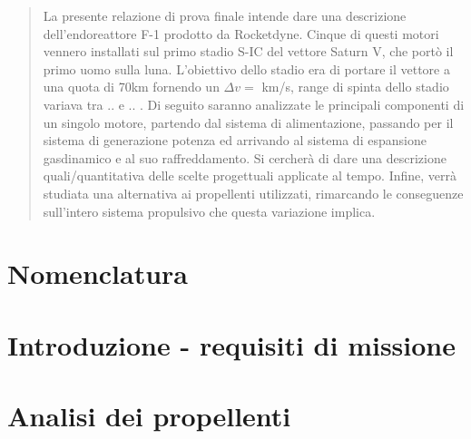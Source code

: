 \documentclass[11pt,a4paper,twocolumn]{article}
\begin{document}


\begin{strip}
    \centering
    \begin{minipage}{1\textwidth}
        \begin{abstract}
La presente relazione di prova finale intende dare una descrizione dell'endoreattore F-1 prodotto da Rocketdyne. Cinque di questi motori vennero installati sul primo stadio S-IC del vettore Saturn V, che portò il primo uomo sulla luna. L'obiettivo dello stadio era di portare il vettore a una quota di 70km fornendo un $\Delta v = $ km/s, range di spinta dello stadio variava tra .. e .. . Di seguito saranno analizzate le principali componenti di un singolo motore, partendo dal sistema di alimentazione, passando per il sistema di generazione potenza ed arrivando al sistema di espansione gasdinamico e al suo raffreddamento. Si cercherà di dare una descrizione quali/quantitativa delle scelte progettuali applicate al tempo. Infine, verrà studiata una alternativa ai propellenti utilizzati, rimarcando le conseguenze sull'intero sistema propulsivo che questa variazione implica.
        \end{abstract}
        \hspace{2cm}
    \end{minipage}
\end{strip}
\section{Nomenclatura}

\label{sec:nomenclatura}
\section{Introduzione - requisiti di missione}

\label{sec:introduzione}
\section{Analisi dei propellenti}

\label{sec:analisi propellenti}
\end{document}
